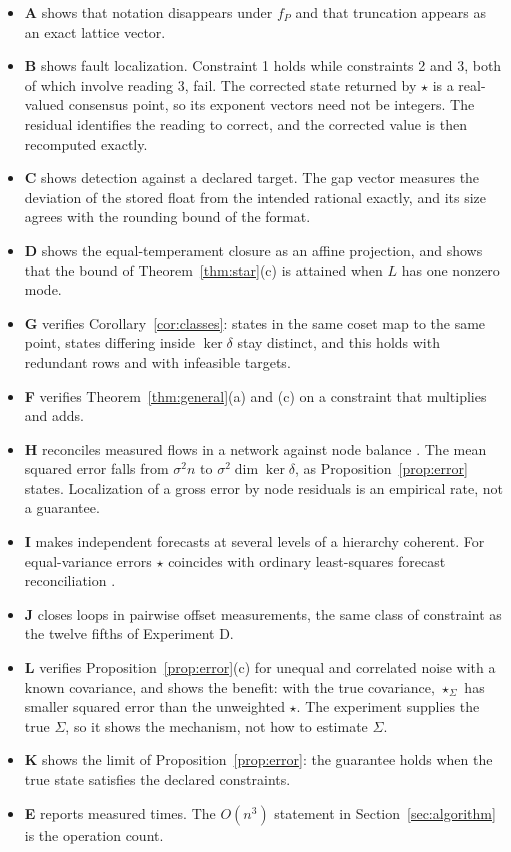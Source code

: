 \documentclass[11pt,letterpaper]{article}
\theoremstyle{plain}
\theoremstyle{definition}
\theoremstyle{remark}
\newcommand{\fP}{f_{P}}
\begin{document}
\begin{itemize}
\item \textbf{A} shows that notation disappears under $\fP$ and that truncation appears as an exact lattice vector.
\item \textbf{B} shows fault localization. Constraint 1 holds while constraints 2 and 3, both of which involve reading 3, fail. The corrected state returned by $\star$ is a real-valued consensus point, so its exponent vectors need not be integers. The residual identifies the reading to correct, and the corrected value is then recomputed exactly.
\item \textbf{C} shows detection against a declared target. The gap vector measures the deviation of the stored float from the intended rational exactly, and its size agrees with the rounding bound of the format.
\item \textbf{D} shows the equal-temperament closure as an affine projection, and shows that the bound of Theorem~\ref{thm:star}(c) is attained when $L$ has one nonzero mode.
\item \textbf{G} verifies Corollary~\ref{cor:classes}: states in the same coset map to the same point, states differing inside $\ker\delta$ stay distinct, and this holds with redundant rows and with infeasible targets.
\item \textbf{F} verifies Theorem~\ref{thm:general}(a) and (c) on a constraint that multiplies and adds.
\item \textbf{H} reconciles measured flows in a network against node balance \cite{mah}. The mean squared error falls from $\sigma^{2}n$ to $\sigma^{2}\dim\ker\delta$, as Proposition~\ref{prop:error} states. Localization of a gross error by node residuals is an empirical rate, not a guarantee.
\item \textbf{I} makes independent forecasts at several levels of a hierarchy coherent. For equal-variance errors $\star$ coincides with ordinary least-squares forecast reconciliation \cite{hyndman}.
\item \textbf{J} closes loops in pairwise offset measurements, the same class of constraint as the twelve fifths of Experiment D.
\item \textbf{L} verifies Proposition~\ref{prop:error}(c) for unequal and correlated noise with a known covariance, and shows the benefit: with the true covariance, $\star_\Sigma$ has smaller squared error than the unweighted $\star$. The experiment supplies the true $\Sigma$, so it shows the mechanism, not how to estimate $\Sigma$.
\item \textbf{K} shows the limit of Proposition~\ref{prop:error}: the guarantee holds when the true state satisfies the declared constraints.
\item \textbf{E} reports measured times. The $O(n^{3})$ statement in Section~\ref{sec:algorithm} is the operation count.
\end{itemize}
\end{document}

